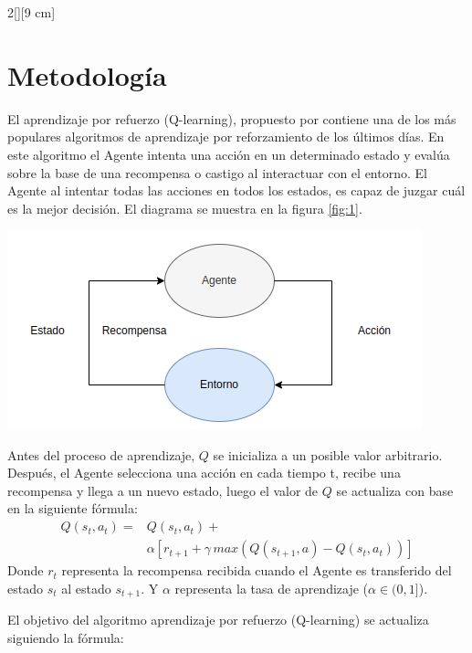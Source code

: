 \documentclass[letterpaper, 10 pt]{article}
\newenvironment{Figura}
{\par\medskip\noindent\minipage{\linewidth}}
{\endminipage\par\medskip}
\begin{document}
\begin{multicols}{2}[][9 cm]
\section{Metodología}

El aprendizaje por refuerzo (Q-learning), propuesto por \cite{watkins1992q} contiene una de los más populares algoritmos de aprendizaje por reforzamiento de los últimos días. En este algoritmo el Agente intenta una acción en un determinado estado y evalúa sobre la base de una recompensa o castigo al interactuar con el entorno. El Agente al intentar todas las acciones en todos los estados, es capaz de juzgar cuál es la mejor decisión. El diagrama se muestra en la figura \ref{fig:1}.

\begin{Figura}
	\centering
	\includegraphics[width=0.9\textwidth]{diagrama.png}
	\label{fig:1}
\end{Figura}   

Antes del proceso de aprendizaje, $Q$ se inicializa a un posible valor arbitrario. Después, el Agente selecciona una acción en cada tiempo t, recibe una recompensa y llega a un nuevo estado, luego el valor de $Q$ se actualiza con base en la siguiente fórmula:
\begin{equation}
	\begin{split}
		\displaystyle	Q(s_t,a_t)  = &Q(s_t,a_t) + \\ & \alpha[r_{t+1} + \gamma \, max(Q(s_{t+1},a) - Q(s_t,a_t) )] \label{eq:1}
	\end{split}
\end{equation}
Donde $r_t$ representa la recompensa recibida cuando el Agente es transferido del estado $s_{t}$ al estado $s_{t+1}$. Y $\alpha$ representa la tasa de aprendizaje ($\alpha \in (0,1]$).

El objetivo del algoritmo aprendizaje por refuerzo (Q-learning) se actualiza siguiendo la fórmula:


\end{multicols}
\end{document}
